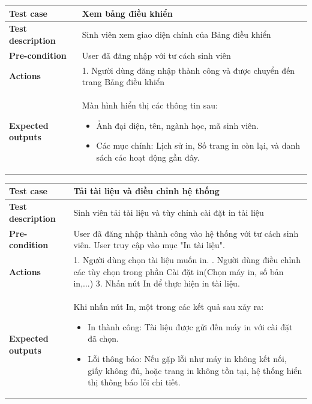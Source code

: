 \begin{itemize}
    \begin{longtable}{|l|p{9cm}|} 
    \hline
    \textbf{Test case} & Xem bảng điều khiển \\
    \hline
    \textbf{Test description} & Sinh viên xem giao diện chính của Bảng điều khiển \\
    \hline
    \textbf{Pre-condition} & User đã đăng nhập với tư cách sinh viên \\
    \hline
    \textbf{Actions} & 1. Người dùng đăng nhập thành công và được chuyển đến trang Bảng điều khiển \\
    \hline
    \textbf{Expected outputs} & 
    \parbox[t]{9cm}{
        Màn hình hiển thị các thông tin sau:
        \begin{itemize}
            \item Ảnh đại diện, tên, ngành học, mã sinh viên.
            \item Các mục chính: Lịch sử in, Số trang in còn lại, và danh sách các hoạt động gần đây.
        \end{itemize}
    } \\
    \hline
    \end{longtable}
    
    \begin{longtable}{|l|p{9cm}|} 
    \hline
    \textbf{Test case} & Tải tài liệu và điều chỉnh hệ thống  \\
    \hline
    \textbf{Test description} & Sinh viên tải tài liệu và tùy chỉnh cài đặt in tài liệu \\
    \hline
    \textbf{Pre-condition} & 
    User đã đăng nhập thành công vào hệ thống với tư cách sinh viên.\newline
    User truy cập vào mục "In tài liệu".\\
    \hline
    \textbf{Actions} & 
    1. Người dùng chọn tài liệu muốn in. \newline
    2. Người dùng điều chỉnh các tùy chọn trong phần Cài đặt in(Chọn máy in, số bản in,...)
    3. Nhấn nút In để thực hiện in tài liệu. \\
    \hline
    \textbf{Expected outputs} & 
    \parbox[t]{9cm}{       
    Khi nhấn nút In, một trong các kết quả sau xảy ra:
    \begin{itemize}
        \item In thành công: Tài liệu được gửi đến máy in với cài đặt đã chọn.
        \item Lỗi thông báo: Nếu gặp lỗi như máy in không kết nối, giấy không đủ, hoặc trang in không tồn tại, hệ thống hiển thị thông báo lỗi chi tiết.
    \end{itemize}
    } \\
    \hline
    \end{longtable}
    

\end{itemize}
